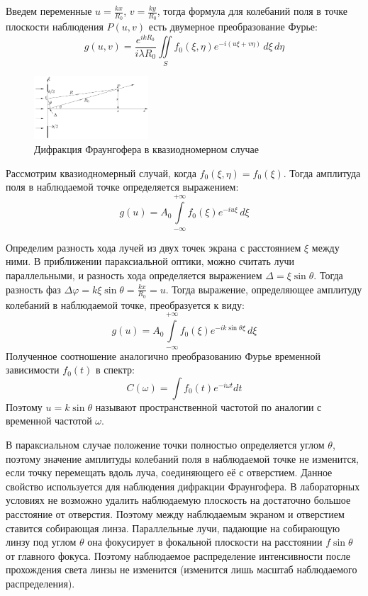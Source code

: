 Введем переменные $u = \frac{kx}{R_0}$, $v = \frac{ky}{R_0}$, тогда формула для колебаний поля в точке плоскости наблюдения $P(u, v)$ есть двумерное преобразование Фурье:
$$
g(u, v) = \frac{e^{i kR_0}}{i \lambda R_0} \iint \limits_S f_0(\xi, \eta) e^{-i (u \xi + v \eta )} \, d\xi \, d\eta
$$

\begin{figure}
	\centering
	\includegraphics[width=0.38\textwidth]{../Изображения/Дифракция Фраунгофера в одномерном случае.png}
	\caption{Дифракция Фраунгофера в квазиодномерном случае}
	\label{img:Fraunhofer-quasi-one-dimensional}
\end{figure}

Рассмотрим квазиодномерный случай, когда $f_0(\xi, \eta) = f_0(\xi)$. Тогда амплитуда поля в наблюдаемой точке определяется выражением:
$$
g(u) = A_0 \int \limits_{-\infty}^{+\infty} f_0(\xi) e^{-i u \xi} \, d\xi
$$

Определим разность хода лучей из двух точек экрана с расстоянием $\xi$ между ними. В приближении параксиальной оптики, можно считать лучи параллельными, и разность хода определяется выражением $\Delta = \xi \sin \theta$. Тогда разность фаз $\Delta \varphi = k \xi \sin \theta = \frac{k x}{R_0} = u$. Тогда выражение, определяющее амплитуду колебаний в наблюдаемой точке, преобразуется к виду:
$$
g(u) = A_0 \int \limits_{-\infty}^{+\infty} f_0(\xi) e^{-i k \sin \theta \xi} \, d\xi
$$
Полученное соотношение аналогично преобразованию Фурье временной зависимости $f_0(t)$ в спектр:
$$
C(\omega) = \int f_0(t) e^{-i \omega t} dt
$$
Поэтому $u = k \sin \theta$ называют пространственной частотой по аналогии с временной частотой $\omega$.

В параксиальном случае положение точки полностью определяется углом $\theta$, поэтому значение амплитуды колебаний поля в наблюдаемой точке не изменится, если точку перемещать вдоль луча, соединяющего её с отверстием. Данное свойство используется для наблюдения дифракции Фраунгофера. В лабораторных условиях не возможно удалить наблюдаемую плоскость на достаточно большое расстояние от отверстия. Поэтому между наблюдаемым экраном и отверстием ставится собирающая линза. Параллельные лучи, падающие на собирающую линзу под углом $\theta$ она фокусирует в фокальной плоскости на расстоянии $f \sin \theta$ от главного фокуса. Поэтому наблюдаемое распределение интенсивности после прохождения света линзы не изменится (изменится лишь  масштаб наблюдаемого распределения).

